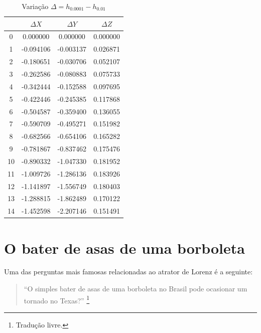 \documentclass[12pt, a4paper]{article}
\begin{document}
\begin{table}[H]
    \centering
    \footnotesize
    \begin{tabular}{|c|c|c|c|}
    \toprule
    & $\Delta X$ & $\Delta Y$ & $\Delta Z$ \\
    \midrule
    0 & 0.000000 & 0.000000 & 0.000000 \\
    1 & -0.094106 & -0.003137 & 0.026871 \\
    2 & -0.180651 & -0.030706 & 0.052107 \\
    3 & -0.262586 & -0.080883 & 0.075733 \\
    4 & -0.342444 & -0.152588 & 0.097695 \\
    5 & -0.422446 & -0.245385 & 0.117868 \\
    6 & -0.504587 & -0.359400 & 0.136055 \\
    7 & -0.590709 & -0.495271 & 0.151982 \\
    8 & -0.682566 & -0.654106 & 0.165282 \\
    9 & -0.781867 & -0.837462 & 0.175476 \\
    10 & -0.890332 & -1.047330 & 0.181952 \\
    11 & -1.009726 & -1.286136 & 0.183926 \\
    12 & -1.141897 & -1.556749 & 0.180403 \\
    13 & -1.288815 & -1.862489 & 0.170122 \\
    14 & -1.452598 & -2.207146 & 0.151491 \\
    \bottomrule
    \end{tabular}
    \caption{Variação $\Delta = h_{0.0001} - h_{0.01}$}
\end{table}

\newpage



\appendix
\section{O bater de asas de uma borboleta}

Uma das perguntas mais famosas relacionadas ao atrator de Lorenz é a
seguinte:

\begin{quote}
    “O simples bater de asas de uma borboleta no Brasil pode ocasionar um
    tornado no Texas?” \footnote{Tradução livre.}
\end{quote}
\end{document}
